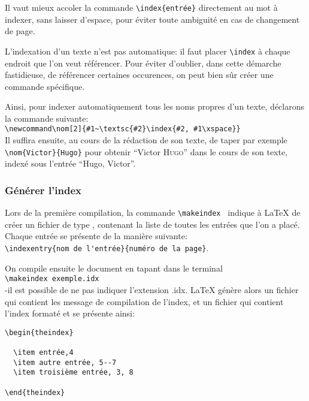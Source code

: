 \begin{attention}
Il vaut mieux accoler la commande \verb+\index{entrée}+ directement au  mot à indexer, sans laisser d'espace, pour éviter toute ambiguité en cas de changement de page.

\end{attention}

L'indexation d'un texte n'est pas automatique: il faut placer \verb+\index+ à chaque endroit  que l'on veut référencer. Pour éviter d'oublier, dans cette démarche fastidieuse, de référencer certaines occurences, on  peut bien sûr créer une commande  spécifique.

Ainsi, pour indexer automatiquement tous les noms propres d'un texte, déclarons la commande suivante:\\
 \verb+\newcommand\nom[2]{#1~\textsc{#2}\index{#2, #1\xspace}}+\\
Il suffira ensuite, au cours de la rédaction de son texte, de taper par exemple \verb|\nom{Victor}{Hugo}| pour obtenir \enquote{Victor \textsc{Hugo}} dans le cours de son texte, indexé sous l'entrée \enquote{Hugo, Victor}.


\subsubsection{Générer l'index}


 Lors de la première compilation, la commande \verb|\makeindex | indique à \LaTeX{} de créer un fichier de type , contenant la liste de toutes les entrées que l'on a placé. Chaque entrée se présente de la manière suivante:\\
\verb+\indexentry{nom de l'entrée}{numéro de la page}+.


On compile ensuite le document en tapant dans le terminal \\ \verb+\makeindex exemple.idx + \\
-il est possible de ne pas indiquer l'extension .idx. \LaTeX{} génère alors un fichier  qui contient les message de compilation de l'index, et un fichier  qui contient l'index formaté et se présente ainsi:

\begin{verbatim}
\begin{theindex}

  \item entrée,4
  \item autre entrée, 5--7
  \item troisième entrée, 3, 8	

\end{theindex} 

\end{verbatim}


